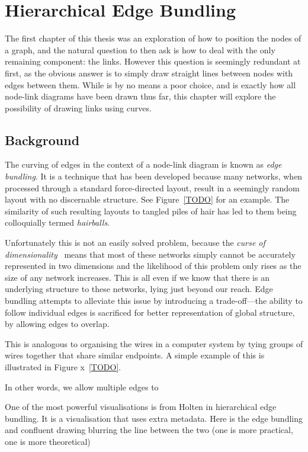 \chapter{Hierarchical Edge Bundling}
The first chapter of this thesis was an exploration of how to position the nodes of a graph, and the natural question to then ask is how to deal with the only remaining component: the links. However this question is seemingly redundant at first, as the obvious answer is to simply draw straight lines between nodes with edges between them. While is by no means a poor choice, and is exactly how all node-link diagrams have been drawn thus far, this chapter will explore the possibility of drawing links using curves.

\section{Background}
The curving of edges in the context of a node-link diagram is known as \textit{edge bundling}. It is a technique that has been developed because many networks, when processed through a standard force-directed layout, result in a seemingly random layout with no discernable structure. See Figure~\ref{TODO} for an example. The similarity of such resulting layouts to tangled piles of hair has led to them being colloquially termed \textit{hairballs}. 

Unfortunately this is not an easily solved problem, because the \textit{curse of dimensionality}~\cite{TODO} means that most of these networks simply cannot be accurately represented in two dimensions and the likelihood of this problem only rises as the size of any network increases. This is all even if we know that there is an underlying structure to these networks, lying just beyond our reach.
Edge bundling attempts to alleviate this issue by introducing a trade-off---the ability to follow individual edges is sacrificed for better representation of global structure, by allowing edges to overlap. 

This is analogous to organising the wires in a computer system by tying groups of wires together that share similar endpoints. A simple example of this is illustrated in Figure x~\ref{TODO}.

In other words, we allow multiple edges to 

One of the most powerful visualisations is from Holten in hierarchical edge bundling. It is a visualisation that uses extra metadata. Here is the 
edge bundling and confluent drawing
blurring the line between the two (one is more practical, one is more theoretical)

